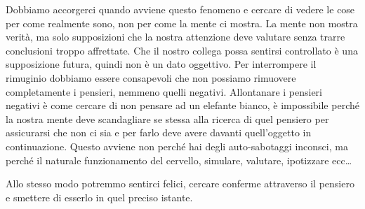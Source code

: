 \documentclass[12pt]{book} %
\begin{document}
Dobbiamo accorgerci quando avviene questo fenomeno e cercare di vedere le cose per come realmente
sono, non per come la mente ci mostra. La mente non mostra verità, ma solo supposizioni che la nostra attenzione deve
valutare senza trarre conclusioni troppo affrettate. Che il nostro collega possa sentirsi controllato è una
supposizione futura, quindi non è un dato oggettivo. Per interrompere il rimuginio dobbiamo essere consapevoli che non
possiamo rimuovere completamente i pensieri, nemmeno quelli negativi. Allontanare i pensieri negativi è come cercare di
non pensare ad un elefante bianco, è impossibile perché la nostra mente deve scandagliare se stessa alla ricerca di
quel pensiero per assicurarsi che non ci sia e per farlo deve avere davanti quell'oggetto in continuazione. Questo
avviene non perché hai degli auto-sabotaggi inconsci, ma perché il naturale funzionamento del cervello, simulare,
valutare, ipotizzare ecc…


\bigskip

Allo stesso modo potremmo sentirci felici, cercare conferme attraverso il pensiero e smettere di esserlo in quel preciso
istante. 
\end{document}
